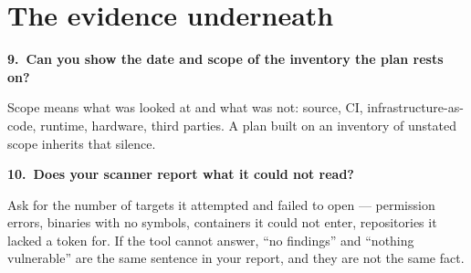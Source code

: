 \documentclass[10pt,a4paper]{article}
\newcommand{\ansbox}{\vspace{2pt}\fbox{\parbox[t][22pt][t]{\dimexpr\linewidth-2\fboxsep-2\fboxrule}{%
  \scriptsize\color{gray}answer}}\par\vspace{4pt}}
\begin{document}
\section*{The evidence underneath}
\textbf{9.\ Can you show the date and scope of the inventory the plan rests on?}\par
{\small\color{black!70} Scope means what was looked at and what was not: source, CI, infrastructure-as-code, runtime, hardware, third parties. A plan built on an inventory of unstated scope inherits that silence.\par}
\ansbox
\textbf{10.\ Does your scanner report what it could not read?}\par
{\small\color{black!70} Ask for the number of targets it attempted and failed to open --- permission errors, binaries with no symbols, containers it could not enter, repositories it lacked a token for. If the tool cannot answer, ``no findings'' and ``nothing vulnerable'' are the same sentence in your report, and they are not the same fact.\par}
\ansbox
\newpage
\end{document}
